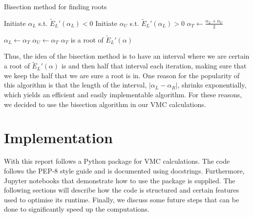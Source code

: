 \documentclass[11pt,a4paper]{article}
\numberwithin{equation}{section}
\begin{document}
\begin{algorithm}
    \caption{Bisection method for finding roots}
    \label{Alg:bisection}
    \begin{algorithmic}[1]
        \State Initiate $\alpha_L$ s.t. $\tilde{E}_L'(\alpha_L) < 0$
        \State Initiate $\alpha_U$ s.t. $\tilde{E}_L'(\alpha_L) > 0$
                \State $\alpha_T \gets \frac{\alpha_L + \alpha_U}{2}$

                    \State $\alpha_L \gets \alpha_T$
                    \State $\alpha_U \gets \alpha_T$
                    \State $\alpha_T$ is a root of $\tilde{E}_L'(\alpha)$
                \EndIf
            \EndWhile
        \EndProcedure
    \end{algorithmic}
\end{algorithm}

Thus, the idea of the bisection method is to have an interval where we are certain a root of $\tilde{E}_L'(\alpha)$ is and then half that interval each iteration, making sure that we keep the half that we are sure a root is in. One reason for the popularity of this algorithm is that the length of the interval, $|\alpha_L - \alpha_R|$, shrinks exponentially, which yields an efficient and easily implementable algorithm. For these reasons, we decided to use the bisection algorithm in our VMC calculations.

\section{Implementation}
With this report follows a Python package for VMC calculations. The code follows the PEP-8 style guide and is documented using docstrings. Furthermore, Jupyter notebooks that demonstrate how to use the package is supplied. The following sections will describe how the code is structured and certain features used to optimise its runtime. Finally, we discuss some future steps that can be done to significantly speed up the computations.
\end{document}
